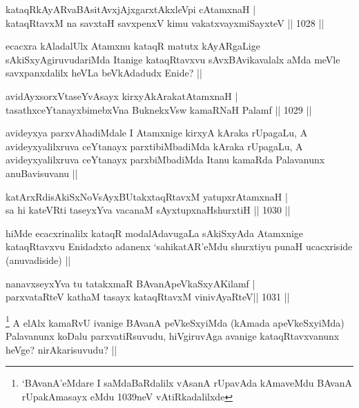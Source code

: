 \begin{shl}
kataqRkAyARvaBAsitAvxjAjxgarxtAkxleV\s pi cA\s \s tamxnaH | \\
kataqRtavxM na savxtaH savxpenxV kimu vakatxvayxmiSayxteV \hfill||  1028 ||  
\end{shl}

\begin{artha}
ecacxra kAladalUlx Atamxnu kataqR matutx kAyARgaLige sAkiSxyAgiruvudariMda Itanige kataqRtavxvu sAvxBAvikavalalx aMda meVle savxpanxdalilx heVLa beVkAdadudx Enide? ||
\end{artha}

\begin{shl}
avidAyxsorxVtaseYvAsayx kirxyAkArakatA\s \s tamxnaH | \\
tasathxceYtanayxbimebxVna BuknekxV\s sw kamaRNaH Palamf \hfill||  1029 ||  
\end{shl}

\begin{artha}
avideyxya parxvAhadiMdale I Atamxnige kirxyA kAraka rUpagaLu, A avideyxyalilxruva ceYtanayx parxtibiMbadiMda kAraka rUpagaLu, A avideyxyalilxruva ceYtanayx parxbiMbadiMda Itanu kamaRda Palavanunx anuBavisuvanu ||
\end{artha}


\begin{shl}
katArxRdisAkiSxNoV\s sAyxBUtakxtaqRtavxM yatupxrA\s \s tamxnaH | \\
sa hi kateVRti taseyxYva vacanaM sAyxtupxnaHshurxtiH \hfill||  1030 ||  
\end{shl}

\begin{artha}
hiMde ecacxrinalilx kataqR modalAdavugaLa sAkiSxyAda Atamxnige kataqRtavxvu Enidadxto adanenx `sahikatAR'eMdu shurxtiyu punaH ucacxriside (anuvadiside) ||
\end{artha}


\begin{shl}
nanavxseyxYva tu tatakxmaR BAvanApeVkaSxyA\s Kilamf | \\
parxvataRteV kathaM tasayx kataqRtavxM vinivAyaRteV\hfill ||  1031 ||  
\end{shl}

\begin{artha}
\footnote{`BAvanA'eMdare I saMdaBaRdalilx vAsanA rUpavAda kAmaveMdu BAvanA rUpakAmasayx eMdu 1039neV vAtiRkadalilxde}
A elAlx kamaRvU ivanige BAvanA peVkeSxyiMda (kAmada apeVkeSxyiMda) Palavanunx koDalu parxvatiRsuvudu, hiVgiruvAga avanige kataqRtavxvanunx heVge? nirAkarisuvudu? ||
\end{artha}

